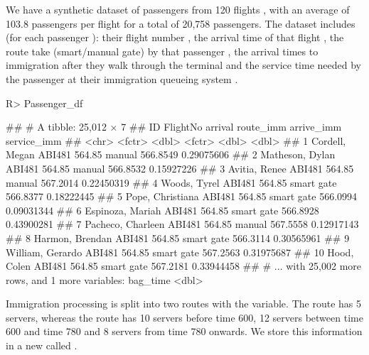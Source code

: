 \documentclass[article]{jss}
\begin{document}
We have a synthetic dataset of passengers  from 120 flights , with an average of 103.8 passengers per flight for a total of 20,758 passengers. The dataset includes (for each passenger ): their flight number , the arrival time of that flight , the route take (smart/manual gate) by that passenger , the arrival times to immigration after they walk through the terminal  and the service time needed by the passenger at their immigration queueing system . 

\begin{CodeChunk}
\begin{CodeInput}
R> Passenger_df
\end{CodeInput}
\begin{CodeOutput}
## # A tibble: 25,012 × 7
##                   ID FlightNo arrival  route_imm arrive_imm service_imm
##                <chr>   <fctr>   <dbl>     <fctr>      <dbl>       <dbl>
## 1     Cordell, Megan   ABI481  564.85     manual   566.8549  0.29075606
## 2    Matheson, Dylan   ABI481  564.85     manual   566.8532  0.15927226
## 3      Avitia, Renee   ABI481  564.85     manual   567.2014  0.22450319
## 4       Woods, Tyrel   ABI481  564.85 smart gate   566.8377  0.18222445
## 5   Pope, Christiana   ABI481  564.85 smart gate   566.0994  0.09031344
## 6   Espinoza, Mariah   ABI481  564.85 smart gate   566.8928  0.43900281
## 7  Pacheco, Charleen   ABI481  564.85     manual   567.5558  0.12917143
## 8    Harmon, Brendan   ABI481  564.85 smart gate   566.3114  0.30565961
## 9   William, Gerardo   ABI481  564.85 smart gate   567.2563  0.31975687
## 10       Hood, Colen   ABI481  564.85 smart gate   567.2181  0.33944458
## # ... with 25,002 more rows, and 1 more variables: bag_time <dbl>
\end{CodeOutput}
\end{CodeChunk}

Immigration processing is split into two routes with the  variable. The  route has 5 servers, whereas the  route has 10 servers before time 600, 12 servers between time 600 and time 780 and 8 servers from time 780 onwards. We store this information in a new  called . 

\begin{CodeChunk}
\end{CodeChunk}
\end{document}
